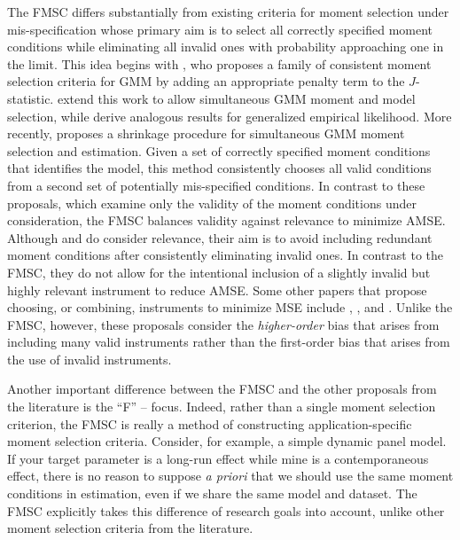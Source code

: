 The FMSC differs substantially from existing criteria for moment selection under mis-specification whose primary aim is to select all correctly specified moment conditions while eliminating all invalid ones with probability approaching one in the limit.
This idea begins with \cite{Andrews1999}, who proposes a family of consistent moment selection criteria for GMM by adding an appropriate penalty term to the $J$-statistic. 
\cite{AndrewsLu} extend this work to allow simultaneous GMM moment and model selection, while \cite{HongPrestonShum} derive analogous results for generalized empirical likelihood.
More recently, \cite{Liao} proposes a shrinkage procedure for simultaneous GMM moment selection and estimation. 
Given a set of correctly specified moment conditions that identifies the model, this method consistently chooses all valid conditions from a second set of potentially mis-specified conditions.
In contrast to these proposals, which examine only the validity of the moment conditions under consideration, the FMSC balances validity against relevance to minimize AMSE.
Although \cite{HallPeixe2003} and \cite{ChengLiao} do consider relevance, their aim is to avoid including redundant moment conditions after consistently eliminating invalid ones.
In contrast to the FMSC, they do not allow for the intentional inclusion of a slightly invalid but highly relevant instrument to reduce AMSE. 
Some other papers that propose choosing, or combining, instruments to minimize MSE include \cite{DonaldNewey2001}, \cite{DonaldImbensNewey2009}, and \cite{KuersteinerOkui2010}.
Unlike the FMSC, however, these proposals consider the \emph{higher-order} bias that arises from including many valid instruments rather than the first-order bias that arises from the use of invalid instruments.

Another important difference between the FMSC and the other proposals from the literature is the ``F'' -- focus. 
Indeed, rather than a single moment selection criterion, the FMSC is really a method of constructing application-specific moment selection criteria.
Consider, for example, a simple dynamic panel model. If your target parameter is a long-run effect while mine is a contemporaneous effect, there is no reason to suppose \emph{a priori} that we should use the same moment conditions in estimation, even if we share the same model and dataset.
The FMSC explicitly takes this difference of research goals into account, unlike other moment selection criteria from the literature.

